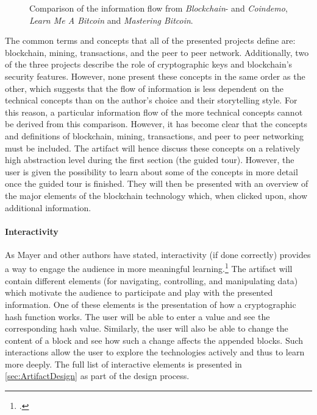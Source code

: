 \begin{figure}
    \centering
    
    \caption{Comparison of the information flow from \textit{Blockchain}- and \textit{Coindemo}, \textit{Learn Me A Bitcoin} and \textit{Mastering Bitcoin}.}
    \label{fig:ProcessBC}
\end{figure}

The common terms and concepts that all of the presented projects define are: blockchain, mining, transactions, and the peer to peer network. Additionally, two of the three projects describe the role of cryptographic keys and blockchain's security features. However, none present these concepts in the same order as the other, which suggests that the flow of information is less dependent on the technical concepts than on the author's choice and their storytelling style. For this reason, a particular information flow of the more technical concepts cannot be derived from this comparison. However, it has become clear that the concepts and definitions of blockchain, mining, transactions, and peer to peer networking must be included. The artifact will hence discuss these concepts on a relatively high abstraction level during the first section (the guided tour). However, the user is given the possibility to learn about some of the concepts in more detail once the guided tour is finished. They will then be presented with an overview of the major elements of the blockchain technology which, when clicked upon, show additional information. 

\paragraph{Interactivity} As Mayer and other authors have stated, interactivity (if done correctly) provides a way to engage the audience in more meaningful learning.\footcites[Cf.][p.310]{MorenoInteractiveMultimodalLearning2007}[cf.][p.160]{ZhangInteractiveMultimediaBasedELearning2005}[cf.][p.190]{LeeScreenDesignGuidelines1999} The artifact will contain different elements (for navigating, controlling, and manipulating data) which motivate the audience to participate and play with the presented information. One of these elements is the presentation of how a cryptographic hash function works. The user will be able to enter a value and see the corresponding hash value. Similarly, the user will also be able to change the content of a block and see how such a change affects the appended blocks. Such interactions allow the user to explore the technologies actively and thus to learn more deeply. The full list of interactive elements is presented in \ref{sec:ArtifactDesign} as part of the design process. 

